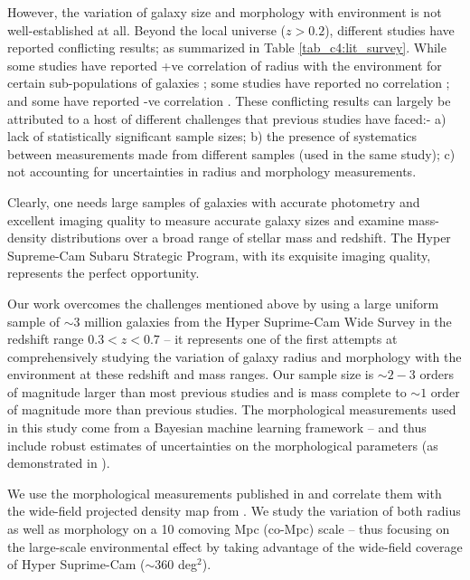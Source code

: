 However, the variation of galaxy size and morphology with environment is not well-established at all. Beyond the local universe ($z > 0.2$), different studies have reported conflicting results; as summarized in Table \ref{tab_c4:lit_survey}. While some studies have reported +ve correlation of radius with the environment for certain sub-populations of galaxies \citep[e.g.,][]{Cooper12,Lani13,Bassett13,Afonso19,Siudek22}; some studies have reported no correlation \citep[e.g.,][]{Huertas-Company13,Kelkar15,Gu21}; and some have reported -ve correlation \citep[e.g.,][]{Matharu19,Chan18}. These conflicting results can largely be attributed to a host of different challenges that previous studies have faced:- a) lack of statistically significant sample sizes; b) the presence of systematics between measurements made from different samples (used in the same study);  c) not accounting for uncertainties in radius and morphology measurements. 

Clearly, one needs large samples of galaxies with accurate photometry and excellent imaging quality to measure accurate galaxy sizes and examine mass-density distributions over a broad range of stellar mass and redshift. The Hyper Supreme-Cam Subaru Strategic Program, with its exquisite imaging quality, represents the perfect opportunity.  

Our work overcomes the challenges mentioned above by using a large uniform sample of $\sim3$ million galaxies from the Hyper Suprime-Cam Wide Survey in the redshift range $0.3 < z < 0.7$ -- it represents one of the first attempts at comprehensively studying the variation of galaxy radius and morphology with the environment at these redshift and mass ranges. Our sample size is $\sim2-3$ orders of magnitude larger than most previous studies and is mass complete to $\sim1$ order of magnitude more than previous studies. The morphological measurements used in this study come from a Bayesian machine learning framework -- and thus include robust estimates of uncertainties on the morphological parameters (as demonstrated in \citet{gampen_software_paper}).

We use the morphological measurements published in \citet{hsc_wide_morphs} and correlate them with the wide-field projected density map from \citet{hsc_den}. We study the variation of both radius as well as morphology on a 10 comoving Mpc (co-Mpc) scale -- thus focusing on the large-scale environmental effect by taking advantage of the wide-field coverage of Hyper Suprime-Cam ($\sim 360$ deg$^2$). 

